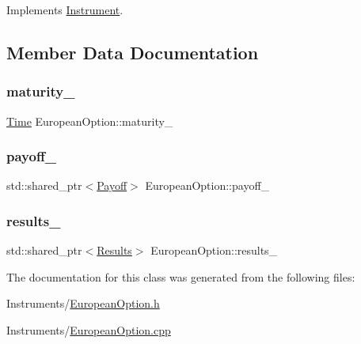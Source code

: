 Implements \hyperlink{class_instrument_a5cd384be384fe415f09ecc78e2a87539}{Instrument}.



\subsection{Member Data Documentation}
\hypertarget{class_european_option_a8853b9bd1af9abc371630ae1c68f304c}{}\label{class_european_option_a8853b9bd1af9abc371630ae1c68f304c} 
\subsubsection{\texorpdfstring{maturity\+\_\+}{maturity\_}}
{\footnotesize\ttfamily \hyperlink{_name_def_8h_ac2d3e0ba793497bcca555c7c2cf64ff3}{Time} European\+Option\+::maturity\+\_\+\hspace{0.3cm}{\ttfamily [private]}}

\hypertarget{class_european_option_a3d597cb0b811f69a08e49b1af13b5a04}{}\label{class_european_option_a3d597cb0b811f69a08e49b1af13b5a04} 
\subsubsection{\texorpdfstring{payoff\+\_\+}{payoff\_}}
{\footnotesize\ttfamily std\+::shared\+\_\+ptr$<$\hyperlink{class_payoff}{Payoff}$>$ European\+Option\+::payoff\+\_\+\hspace{0.3cm}{\ttfamily [private]}}

\hypertarget{class_european_option_a228f13a5ce4c46caef1e3052b4a27610}{}\label{class_european_option_a228f13a5ce4c46caef1e3052b4a27610} 
\subsubsection{\texorpdfstring{results\+\_\+}{results\_}}
{\footnotesize\ttfamily std\+::shared\+\_\+ptr$<$\hyperlink{class_european_option_1_1_results}{Results}$>$ European\+Option\+::results\+\_\+\hspace{0.3cm}{\ttfamily [private]}}



The documentation for this class was generated from the following files\+:\begin{DoxyCompactItemize}
\item 
Instruments/\hyperlink{_european_option_8h}{European\+Option.\+h}\item 
Instruments/\hyperlink{_european_option_8cpp}{European\+Option.\+cpp}\end{DoxyCompactItemize}
